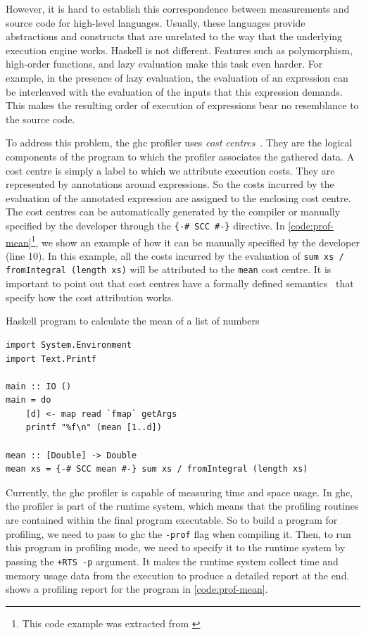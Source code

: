 However, it is hard to establish this correspondence between measurements and source code for high-level languages. Usually, these languages provide abstractions and constructs that are unrelated to the way that the underlying execution engine works. Haskell is not different. Features such as polymorphism, high-order functions, and lazy evaluation make this task even harder. For example, in the presence of lazy evaluation, the evaluation of an expression can be interleaved with the evaluation of the inputs that this expression demands. This makes the resulting order of execution of expressions bear no resemblance to the source code.

To address this problem, the \ac{ghc} profiler uses \emph{cost centres}~\cite{sansom:1995}. They are the logical components of the program to which the profiler associates the gathered data. A cost centre is simply a label to which we attribute execution costs. They are represented by annotations around expressions. So the costs incurred by the evaluation of the annotated expression are assigned to the enclosing cost centre. The cost centres can be automatically generated by the compiler or manually specified by the developer through the \texttt{\{-\# SCC \#-\}} directive. In \autoref{code:prof-mean}\footnote{This code example was extracted from \cite{sullivan:2008}}, we show an example of how it can be manually specified by the developer (line 10). In this example, all the costs incurred by the evaluation of \texttt{sum xs / fromIntegral (length xs)} will be attributed to the \texttt{mean} cost centre. It is important to point out that cost centres have a formally defined semantics~\cite{sansom:1995} that specify how the cost attribution works.

\begin{listing}
  \caption{Haskell program to calculate the mean of a list of numbers}
  \begin{verbatim}
import System.Environment
import Text.Printf

main :: IO ()
main = do
    [d] <- map read `fmap` getArgs
    printf "%f\n" (mean [1..d])

mean :: [Double] -> Double
mean xs = {-# SCC mean #-} sum xs / fromIntegral (length xs)
  \end{verbatim}
  \label{code:prof-mean}
\end{listing}

Currently, the \ac{ghc} profiler is capable of measuring time and space usage. In \ac{ghc}, the profiler is part of the runtime system, which means that the profiling routines are contained within the final program executable. So to build a program for profiling, we need to pass to \ac{ghc} the \texttt{-prof} flag when compiling it. Then, to run this program in profiling mode, we need to specify it to the runtime system by passing the \texttt{+RTS -p} argument. It makes the runtime system collect time and memory usage data from the execution to produce a detailed report at the end.  shows a profiling report for the program in \autoref{code:prof-mean}.

